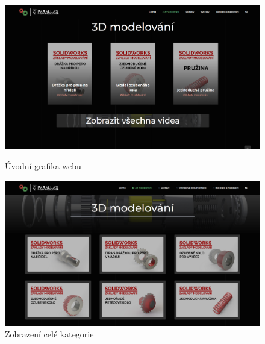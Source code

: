 \begin{figure}[htbp]
    \centering
    \begin{minipage}[b]{0.45\textwidth}
        \centering
        \includegraphics[width=1\textwidth]{img/020/web/web-hp3.png}
        \caption{Úvodní grafika webu}
        \label{fig:p3dportal-hp3}
    \end{minipage}
    \qquad
    \begin{minipage}[b]{0.45\textwidth}
        \centering
        \includegraphics[width=1\textwidth]{img/020/web/web-cat.png}
        \caption{Zobrazení celé kategorie}
        \label{fig:p3dportal-cat}
    \end{minipage}
\end{figure}

